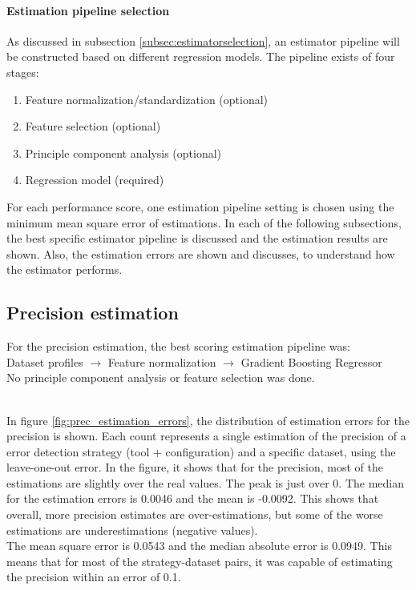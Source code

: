 \paragraph{Estimation pipeline selection} As discussed in subsection \ref{subsec:estimatorselection}, an estimator pipeline will be constructed based on different regression models. The pipeline exists of four stages:
\begin{enumerate}
    \item Feature normalization/standardization (optional)
    \item Feature selection (optional)
    \item Principle component analysis (optional)
    \item Regression model (required)
\end{enumerate}

For each performance score, one estimation pipeline setting is chosen using the minimum mean square error of estimations. In each of the following subsections, the best specific estimator pipeline is discussed and the estimation results are shown. Also, the estimation errors are shown and discusses, to understand how the estimator performs.

\subsection{Precision estimation}
For the precision estimation, the best scoring estimation pipeline was:
~\\Dataset profiles $\rightarrow$ Feature normalization $\rightarrow$ Gradient Boosting Regressor
\\No principle component analysis or feature selection was done. 

~\\In figure \ref{fig:prec_estimation_errors}, the distribution of estimation errors for the precision is shown. Each count represents a single estimation of the precision of a error detection strategy (tool + configuration) and a specific dataset, using the leave-one-out error. In the figure, it shows that for the precision, most of the estimations are slightly over the real values. The peak is just over 0. The median for the estimation errors is 0.0046 and the mean is -0.0092. This shows that overall, more precision estimates are over-estimations, but some of the worse estimations are underestimations (negative values). 
~\\The mean square error is 0.0543 and the median absolute error is 0.0949. This means that for most of the strategy-dataset pairs, it was capable of estimating the precision within an error of 0.1. 

